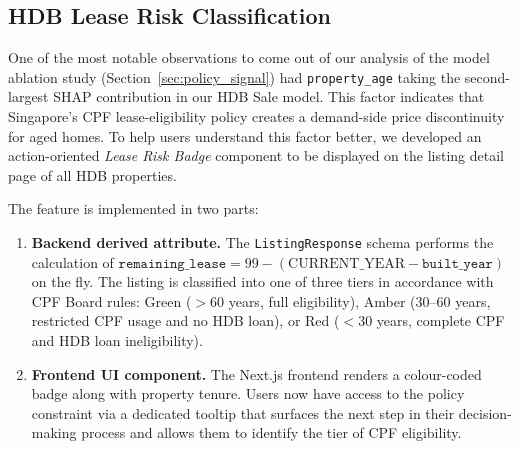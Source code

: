 \subsection{HDB Lease Risk Classification}
\label{sec:lease_badge_impl}

One of the most notable observations to come out of our analysis of the model 
ablation study (Section~\ref{sec:policy_signal}) had \texttt{property\_age} 
taking the second-largest SHAP contribution in our HDB Sale model. This factor 
indicates that Singapore’s CPF lease-eligibility policy creates a demand-side 
price discontinuity for aged homes. To help users understand this factor 
better, we developed an action-oriented \textit{Lease Risk Badge} component to 
be displayed on the listing detail page of all HDB properties.

The feature is implemented in two parts:
\begin{enumerate}
    \item \begin{sloppypar}\textbf{Backend derived attribute.} The 
    \texttt{ListingResponse} schema performs the calculation of 
    $\texttt{remaining\_lease} = 99 - (\text{CURRENT\_YEAR} - \texttt{built\_year})$ 
    on the fly. The listing is classified into one of three tiers in 
    accordance with CPF Board rules: Green ($>60$ years, full eligibility), 
    Amber ($30$--$60$ years, restricted CPF usage and no HDB loan), or Red 
    ($<30$ years, complete CPF and HDB loan ineligibility).\end{sloppypar}
    \item \textbf{Frontend UI component.} The Next.js frontend renders a 
    colour-coded badge along with property tenure. Users now have access to 
    the policy constraint via a dedicated tooltip that surfaces the next step 
    in their decision-making process and allows them to identify the tier of 
    CPF eligibility.
\end{enumerate}
